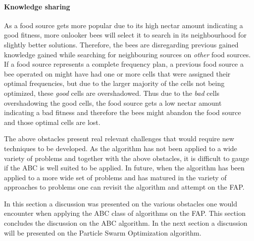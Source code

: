 \paragraph{Knowledge sharing}
As a food source gets more popular due to its high nectar amount indicating a good fitness, more onlooker bees will select it to search in its neighbourhood for slightly better solutions. Therefore, the bees are disregarding previous gained knowledge gained while searching for neighbouring sources on \emph{other} food sources. If a food source represents a complete frequency plan, a previous food source a bee operated on might have had one or more cells that were assigned their optimal frequencies, but due to the larger majority of the cells not being optimized, these \emph{good} cells are overshadowed. Thus due to the \emph{bad} cells overshadowing the good cells, the food source gets a low nectar amount indicating a bad fitness and therefore the bees might abandon the food source and those optimal cells are lost.

The above obstacles present real relevant challenges that would require new techniques to be developed. As the algorithm has not been applied to a wide variety of problems and together with the above obstacles, it is difficult to gauge if the ABC is well suited to be applied. In future, when the algorithm has been applied to a more wide set of problems and has matured in the variety of approaches to problems one can revisit the algorithm and attempt on the FAP.

In this section a discussion was presented on the various obstacles one would encounter when applying the ABC class of algorithms on the FAP. This section concludes the discussion on the ABC algorithm. In the next section a discussion will be presented on the Particle Swarm Optimization algorithm.
